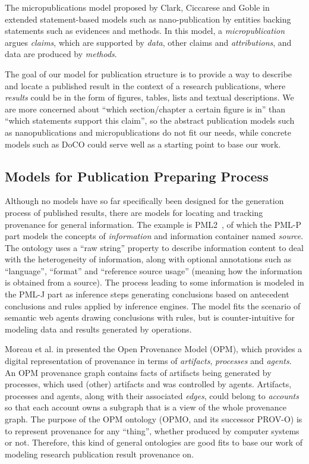The micropublications model proposed by Clark, Ciccarese and Goble in \cite{clark2013micropublications} extended statement-based models such as nano-publication by entities backing statements such as evidences and methods. In this model, a \emph{micropublication} argues \emph{claims}, which are supported by \emph{data}, other claims and \emph{attributions}, and data are produced by \emph{methods}.

The goal of our model for publication structure is to provide a way to describe and locate a published result in the context of a research publications, where \emph{results} could be in the form of figures, tables, lists and textual descriptions. We are more concerned about ``which section/chapter a certain figure is in'' than ``which statements support this claim'', so the abstract publication models such as nanopublications and micropublications do not fit our needs, while concrete models such as DoCO could serve well as a starting point to base our work.



\subsection{Models for Publication Preparing Process}
Although no models have so far specifically been designed for the generation process of published results, there are models for locating and tracking provenance for general information. The example is PML2~\cite{mcguinness2007pml}, of which the PML-P part models the concepts of \emph{information} and information container named \emph{source}. The ontology uses a ``raw string'' property to describe information content to deal with the heterogeneity of information, along with optional annotations such as ``language'', ``format'' and ``reference source usage'' (meaning how the information is obtained from a source). The process leading to some information is modeled in the PML-J part as inference steps generating conclusions based on antecedent conclusions and rules applied by inference engines. The model fits the scenario of semantic web agents drawing conclusions with rules, but is counter-intuitive for modeling data and results generated by operations.

Moreau et al. in \cite{moreau2011open} presented the Open Provenance Model (OPM), which provides a digital representation of provenance in terms of \emph{artifacts}, \emph{processes} and \emph{agents}. An OPM provenance graph contains facts of artifacts being generated by processes, which used (other) artifacts and was controlled by agents. Artifacts, processes and agents, along with their associated \emph{edges}, could belong to \emph{accounts} so that each account owns a subgraph that is a view of the whole provenance graph. The purpose of the OPM ontology (OPMO, and its successor PROV-O) is to represent provenance for any ``thing'', whether produced by computer systems or not. Therefore, this kind of general ontologies are good fits to base our work of modeling research publication result provenance on.

